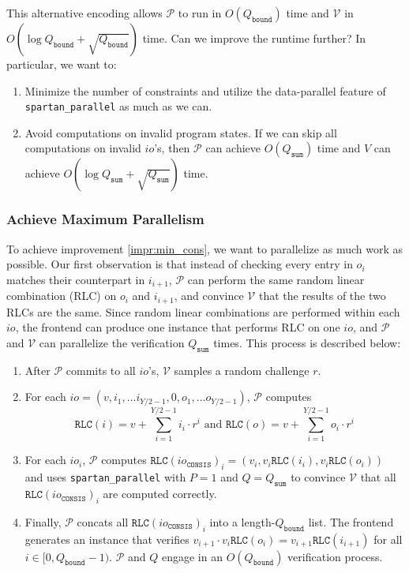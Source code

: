 \documentclass{article}
\newcommand{\code}{\texttt}
\newcommand{\Qbound}{Q_{\mathtt{bound}}}
\newcommand{\Qsum}{Q_{\mathtt{sum}}}
\renewcommand{\P}{\mathcal{P}}
\newcommand{\V}{\mathcal{V}}
\newcommand{\RLC}{\mathtt{RLC}}
\newcommand{\ioc}{io_{\mathtt{CONSIS}}}
\begin{document}
This alternative encoding allows $\P$ to run in $O(\Qbound)$ time and $\V$ in $O(\log \Qbound + \sqrt{\Qbound})$ time. Can we improve the runtime further? In particular, we want to:
\begin{enumerate}
    \item \label{impr:min_cons} Minimize the number of constraints and utilize the data-parallel feature of \code{spartan\_parallel} as much as we can.
    \item \label{impr:min_comp} Avoid computations on invalid program states. If we can skip all computations on invalid $io$'s, then $\P$ can achieve $O(\Qsum)$ time and $V$ can achieve $O(\log\Qsum + \sqrt{\Qsum})$ time.
\end{enumerate}

\subsubsection{Achieve Maximum Parallelism}

To achieve improvement \ref{impr:min_cons}, we want to parallelize as much work as possible. Our first observation is that instead of checking every entry in $o_i$ matches their counterpart in $i_{i + 1}$, $\P$ can perform the same random linear combination (RLC) on $o_i$ and $i_{i + 1}$, and convince $\V$ that the results of the two RLCs are the same. Since random linear combinations are performed within each $io$, the frontend can produce one instance that performs RLC on one $io$, and $\P$ and $\V$ can parallelize the verification $\Qsum$ times. This process is described below:
\begin{enumerate}
    \item After $\P$ commits to all $io$'s, $\V$ samples a random challenge $r$.
    \item For each $io = (v, i_1, \dots i_{Y/2 - 1}, 0, o_1, \dots o_{Y/2 - 1})$, $\P$ computes
    $$\displaystyle\RLC(i) = v + \sum_{i = 1}^{Y/2 - 1} i_i\cdot r^i \mbox{ and } \RLC(o) = v + \sum_{i = 1}^{Y/2 - 1} o_i\cdot r^i$$
    \item For each $io_i$, $\P$ computes $\RLC(\ioc)_i = (v_i, v_i\RLC(i_i), v_i\RLC(o_i))$ and uses \code{spartan\_parallel} with $P = 1$ and $Q = \Qsum$ to convince $\V$ that all $\RLC(\ioc)_i$ are computed correctly.
    \item Finally, $\P$ concats all $\RLC(\ioc)_i$ into a length-$\Qbound$ list. The frontend generates an instance that verifies $v_{i+1}\cdot v_i\RLC(o_i) = v_{i+1}\RLC(i_{i+1})$ for all $i\in [0, \Qbound - 1)$. $\P$ and $Q$ engage in an $O(\Qbound)$ verification process.
\end{enumerate}
\end{document}
